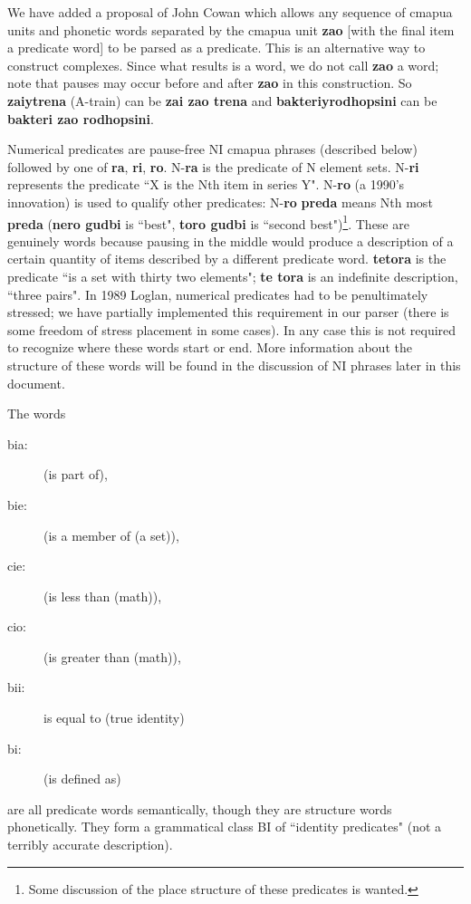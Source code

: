 \documentclass[12pt]{book}
\begin{document}
We have added a proposal of John Cowan which allows any sequence of cmapua units and phonetic words separated by the cmapua unit {\bf zao} [with the final item a predicate word] to be parsed as a predicate.
This is an alternative way to construct complexes.  Since what results is a word, we do not call {\bf zao} a word;  note that pauses may occur before and after {\bf zao} in
this construction.  So {\bf zaiytrena} (A-train) can be {\bf zai zao trena} and {\bf bakteriyrodhopsini} can be {\bf bakteri zao rodhopsini}.

Numerical predicates are pause-free NI cmapua phrases (described below) followed by one of {\bf ra}, {\bf ri}, {\bf ro}.  N-{\bf ra} is the predicate of N element sets.
N-{\bf ri} represents the predicate ``X is the Nth item in series Y".  N-{\bf ro} (a 1990's innovation) is used to qualify other predicates:  N-{\bf ro} {\bf preda} means
Nth most {\bf preda} ({\bf nero gudbi} is ``best", {\bf toro gudbi} is ``second best")\footnote{Some discussion of the place structure of these predicates is wanted.}.  These are genuinely words because pausing in the middle would produce a description of a certain quantity of items described by a different predicate word.  {\bf tetora} is the predicate ``is a set with thirty two elements";  {\bf te tora} is an indefinite description, ``three pairs".
In 1989 Loglan, numerical predicates had to be penultimately stressed;  we have partially implemented this requirement in our parser (there is some freedom of stress placement in some cases).  In any case this is not required to recognize where these words start or end.   More information about the structure of these words will be found in the discussion of NI phrases later in this document.

The words 

\begin{description}
\item[bia:] (is part of), 
\item[bie:] (is a member of (a set)), 
\item[cie:] (is less than (math)), 
\item[cio:] (is greater than (math)), 
\item[bii:]  is equal to (true identity)
\item[bi:]  (is defined as)
\end{description}
 are all predicate words semantically, though they are structure words phonetically.   They form a grammatical class BI of ``identity predicates" (not a terribly accurate description).
\end{document}
